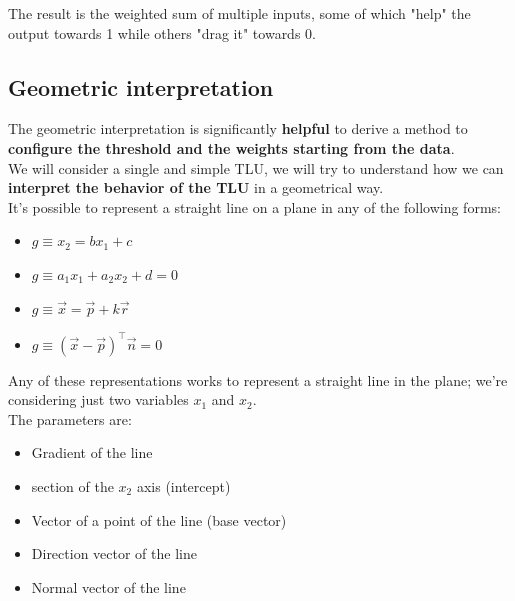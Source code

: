 \documentclass[11pt]{article}
\begin{document}
		The result is the weighted sum of multiple inputs, some of which "help" the output towards 1 while others "drag it" towards 0.\\
		
		\newpage
		
		\subsection{Geometric interpretation}
		The geometric interpretation is significantly \textbf{helpful} to derive a method to \textbf{configure the threshold and the weights starting from the data}. \\
		
		We will consider a single and simple TLU, we will try to understand how we can \textbf{interpret the behavior of the TLU} in a geometrical way. \\
		
		It's possible to represent a straight line on a plane in any of the following forms:
		\begin{itemize}
			\item {} $g \equiv x_2 = b x_1 + c$
			
			\item {} $g \equiv a_1 x_1 + a_2 x_2 + d = 0$
			
			\item {} $ g \equiv  \vec{x} = \vec{p} + k \vec{r} $
			
			\item {} $ g \equiv  \left(\vec{x} - \vec{p}\right)^{\top} \vec{n} = 0 $
		\end{itemize}
		
		Any of these representations works to represent a straight line in the plane; we're considering just two variables $x_1$ and $x_2$.\\
		
		The parameters are: 
		\begin{itemize}
			\item {} Gradient of the line
			\item {} section of the $x_2$ axis (intercept)
			\item {} Vector of a point of the line (base vector)
			\item {} Direction vector of the line
			\item {} Normal vector of the line
		\end{itemize}
		
\end{document}
